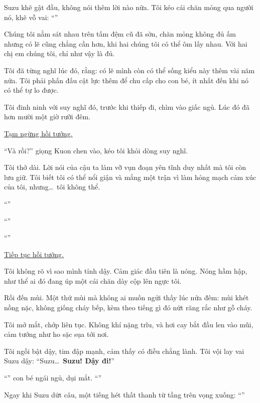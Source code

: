 \documentclass[../main.tex]{subfiles}
\begin{document}
Suzu khẽ gật đầu, không nói thêm lời nào nữa. Tôi kéo cái chăn mỏng qua người nó, khẽ vỗ vai: ``''

Chúng tôi nằm sát nhau trên tấm đệm cũ đã sờn, chăn mỏng không đủ ấm nhưng có lẽ cũng chẳng cần hơn, khi hai chúng tôi có thể ôm lấy nhau. Với hai chị em chúng tôi, chỉ như vậy là đủ.

Tôi đã từng nghĩ lúc đó, rằng: có lẽ mình còn có thể sống kiểu này thêm vài năm nữa. Tôi phải phấn đấu cật lực thêm để chu cấp cho con bé, ít nhất đến khi nó có thể tự lo được.

Tôi đinh ninh với suy nghĩ đó, trước khi thiếp đi, chìm vào giấc ngủ. Lúc đó đã hơn mười một giờ rưỡi đêm.

\begin{center}
    \uline{Tạm ngừng hồi tưởng.}
\end{center}

``Và rồi?'' giọng Kuon chen vào, kéo tôi khỏi dòng suy nghĩ.

Tôi thở dài. Lời nói của cậu ta làm vỡ vụn đoạn yên tĩnh duy nhất mà tôi còn lưu giữ. Tôi biết tôi có thể nổi giận và mắng một trận vì làm hỏng mạch cảm xúc của tôi, nhưng\dots\ tôi không thể.

``''

``''

``''

\begin{center}
    \uline{Tiếp tục hồi tưởng.}
\end{center}

Tôi không rõ vì sao mình tỉnh dậy. Cảm giác đầu tiên là nóng. Nóng hầm hập, như thể ai đó đang úp một cái chăn dày cộp lên ngực tôi.

Rồi đến mùi. Một thứ mùi mà không ai muốn ngửi thấy lúc nửa đêm: mùi khét nồng nặc, không giống cháy bếp, kèm theo tiếng gì đó nứt răng rắc như gỗ cháy.

Tôi mở mắt, chớp liên tục. Không khí nặng trĩu, và hơi cay bắt đầu len vào mũi, cảm tưởng như ho sặc sụa tới nơi.

Tôi ngồi bật dậy, tim đập mạnh, cảm thấy có điều chẳng lành. Tôi vội lay vai Suzu dậy: ``Suzu\dots\ \textbf{Suzu! Dậy đi!}''

``'' con bé ngái ngủ, dụi mắt. ``''

Ngay khi Suzu dứt câu, một tiếng hét thất thanh từ tầng trên vọng xuống: ``''
\end{document}
